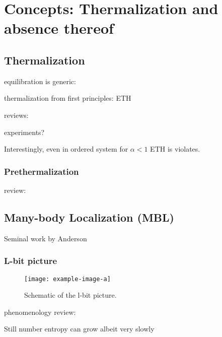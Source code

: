 \chapter{Concepts: Thermalization and absence thereof}\label{ch:another}
\section{Thermalization}
equilibration is generic: \cite{reimannFoundationStatisticalMechanics2008,lindenQuantumMechanicalEvolution2009}

thermalization from first principles: ETH \cite{deutschQuantumStatisticalMechanics1991,srednickiChaosQuantumThermalization1994,rigolThermalizationItsMechanism2008}

reviews: \cite{gogolinEquilibrationThermalisationEmergence2016,dalessioQuantumChaosEigenstate2016,deutschEigenstateThermalizationHypothesis2018,moriThermalizationPrethermalizationIsolated2018}

experiments?

Interestingly, even in ordered system for $\alpha<1$ ETH is violates\cite{sugimotoEigenstateThermalizationLongRange2022}.


\subsection{Prethermalization}

review: \cite{moriThermalizationPrethermalizationIsolated2018}

\section{Many-body Localization (MBL)}

Seminal work by Anderson \cite{andersonAbsenceDiffusionCertain1958}

\subsection{L-bit picture}

\begin{figure}[htb]
	\centering
	\texttt{[image: example-image-a]}
	\caption{Schematic of the l-bit picture.}
\end{figure}

phenomenology review: \cite{imbrieReviewLocalIntegrals2017}


Still number entropy can grow albeit very slowly\cite{kiefer-emmanouilidisEvidenceUnboundedGrowth2020,chavezUltraslowGrowthNumber2023}

